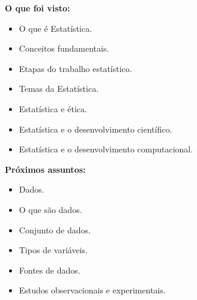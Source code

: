 \documentclass[
  ignorenonframetext,
  serif,
  professionalfont,
  usenames,
  dvipsnames,
  aspectratio = 169]{beamer}
\providecommand{\tightlist}{%
  \setlength{\itemsep}{0pt}\setlength{\parskip}{0pt}}
\renewcommand{\tightlist}{%
  \setlength{\itemsep}{0\baselineskip}
  \setlength{\parskip}{0.25\baselineskip}
}
\def\beginAHalfColumn{\begin{minipage}{0.49\textwidth}}%
\def\endColumns{\end{minipage}}%
\begin{document}
\begin{frame}{}
\protect\hypertarget{section-1}{}
\beginAHalfColumn

\textbf{O que foi visto:}

\begin{itemize}
\tightlist
\item
  O que é Estatística.
\item
  Conceitos fundamentais.
\item
  Etapas do trabalho estatístico.
\item
  Temas da Estatística.
\item
  Estatística e ética.
\item
  Estatística e o desenvolvimento científico.
\item
  Estatística e o desenvolvimento computacional.
\end{itemize}

\endColumns
\beginAHalfColumn

\textbf{Próximos assuntos:}

\begin{itemize}
\tightlist
\item
  Dados.
\item
  O que são dados.
\item
  Conjunto de dados.
\item
  Tipos de variáveis.
\item
  Fontes de dados.
\item
  Estudos observacionais e experimentais.
\end{itemize}

\endColumns
\end{frame}
\end{document}
